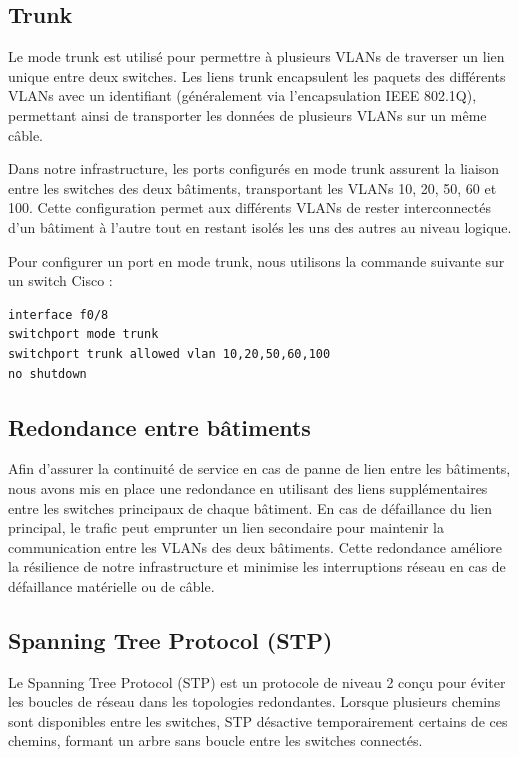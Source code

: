 \documentclass[a4paper,12pt,openany]{report}
\begin{document}
            \subsection{Trunk}
                Le mode trunk est utilisé pour permettre à plusieurs VLANs de traverser un lien unique entre deux switches. Les liens trunk encapsulent les paquets des différents VLANs avec un identifiant (généralement via l'encapsulation IEEE 802.1Q), permettant ainsi de transporter les données de plusieurs VLANs sur un même câble.

                Dans notre infrastructure, les ports configurés en mode trunk assurent la liaison entre les switches des deux bâtiments, transportant les VLANs 10, 20, 50, 60 et 100. Cette configuration permet aux différents VLANs de rester interconnectés d'un bâtiment à l'autre tout en restant isolés les uns des autres au niveau logique. 

                Pour configurer un port en mode trunk, nous utilisons la commande suivante sur un switch Cisco :

                \begin{verbatim}
interface f0/8
switchport mode trunk
switchport trunk allowed vlan 10,20,50,60,100
no shutdown
                \end{verbatim}

            \subsection{Redondance entre bâtiments}
                Afin d'assurer la continuité de service en cas de panne de lien entre les bâtiments, nous avons mis en place une redondance en utilisant des liens supplémentaires entre les switches principaux de chaque bâtiment. En cas de défaillance du lien principal, le trafic peut emprunter un lien secondaire pour maintenir la communication entre les VLANs des deux bâtiments. Cette redondance améliore la résilience de notre infrastructure et minimise les interruptions réseau en cas de défaillance matérielle ou de câble.

            \subsection{Spanning Tree Protocol (STP)}
                Le Spanning Tree Protocol (STP) est un protocole de niveau 2 conçu pour éviter les boucles de réseau dans les topologies redondantes. Lorsque plusieurs chemins sont disponibles entre les switches, STP désactive temporairement certains de ces chemins, formant un arbre sans boucle entre les switches connectés. 
\end{document}

